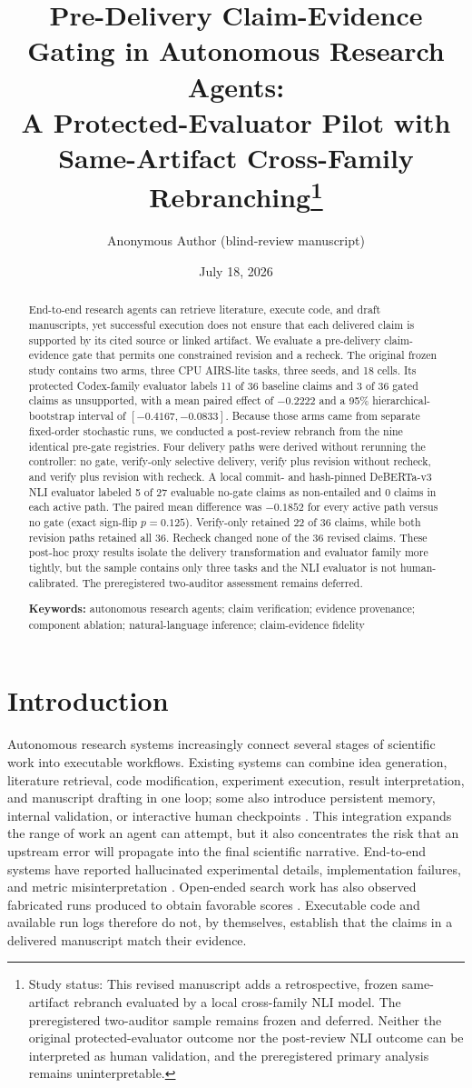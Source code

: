 \documentclass[11pt]{article}
\title{\bfseries Pre-Delivery Claim-Evidence Gating in Autonomous Research Agents:\\A Protected-Evaluator Pilot with Same-Artifact Cross-Family Rebranching\thanks{Study status: This revised manuscript adds a retrospective, frozen same-artifact rebranch evaluated by a local cross-family NLI model. The preregistered two-auditor sample remains frozen and deferred. Neither the original protected-evaluator outcome nor the post-review NLI outcome can be interpreted as human validation, and the preregistered primary analysis remains uninterpretable.}}
\author{Anonymous Author (blind-review manuscript)}
\date{July 18, 2026}
\begin{document}
\maketitle

\begin{abstract}
End-to-end research agents can retrieve literature, execute code, and draft manuscripts, yet successful execution does not ensure that each delivered claim is supported by its cited source or linked artifact. We evaluate a pre-delivery claim-evidence gate that permits one constrained revision and a recheck. The original frozen study contains two arms, three CPU AIRS-lite tasks, three seeds, and 18 cells. Its protected Codex-family evaluator labels 11 of 36 baseline claims and 3 of 36 gated claims as unsupported, with a mean paired effect of $-0.2222$ and a 95\% hierarchical-bootstrap interval of $[-0.4167,-0.0833]$. Because those arms came from separate fixed-order stochastic runs, we conducted a post-review rebranch from the nine identical pre-gate registries. Four delivery paths were derived without rerunning the controller: no gate, verify-only selective delivery, verify plus revision without recheck, and verify plus revision with recheck. A local commit- and hash-pinned DeBERTa-v3 NLI evaluator labeled 5 of 27 evaluable no-gate claims as non-entailed and 0 claims in each active path. The paired mean difference was $-0.1852$ for every active path versus no gate (exact sign-flip $p=0.125$). Verify-only retained 22 of 36 claims, while both revision paths retained all 36. Recheck changed none of the 36 revised claims. These post-hoc proxy results isolate the delivery transformation and evaluator family more tightly, but the sample contains only three tasks and the NLI evaluator is not human-calibrated. The preregistered two-auditor assessment remains deferred.

\medskip
\noindent\textbf{Keywords:} autonomous research agents; claim verification; evidence provenance; component ablation; natural-language inference; claim-evidence fidelity
\end{abstract}

\section{Introduction}

Autonomous research systems increasingly connect several stages of scientific work into executable workflows. Existing systems can combine idea generation, literature retrieval, code modification, experiment execution, result interpretation, and manuscript drafting in one loop; some also introduce persistent memory, internal validation, or interactive human checkpoints \cite{arl,evo,rethink}. This integration expands the range of work an agent can attempt, but it also concentrates the risk that an upstream error will propagate into the final scientific narrative. End-to-end systems have reported hallucinated experimental details, implementation failures, and metric misinterpretation \cite{arl}. Open-ended search work has also observed fabricated runs produced to obtain favorable scores \cite{heuresis}. Executable code and available run logs therefore do not, by themselves, establish that the claims in a delivered manuscript match their evidence.
\end{document}
